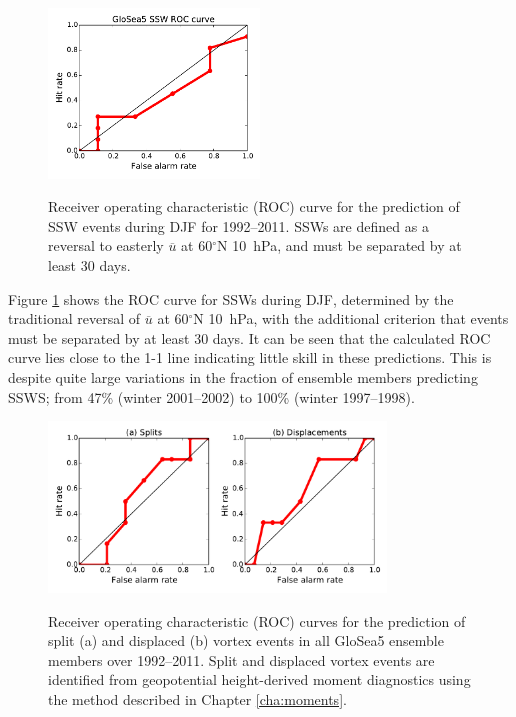 \begin{figure}[t] \centering
  \noindent\includegraphics[width=0.5\textwidth,angle=0]{figures/chapter-seasonal/SSW_ROC.pdf}\\
  \caption[ROC curve for the prediction of SSWs.]{Receiver operating
    characteristic (ROC) curve for the prediction of SSW events during DJF for
    1992--2011. SSWs are defined as a reversal to easterly $\overline{u}$ at
    60$^{\circ}$N 10~hPa, and must be separated by at least 30
    days.}\label{fig:ssw_roc}
\end{figure}

Figure \ref{fig:ssw_roc} shows the ROC curve for SSWs during DJF, determined by
the traditional reversal of $\overline{u}$ at 60$^\circ$N 10~hPa, with the
additional criterion that events must be separated by at least 30 days. It can
be seen that the calculated ROC curve lies close to the 1-1 line indicating
little skill in these predictions. This is despite quite large variations in the
fraction of ensemble members predicting SSWS; from 47\% (winter 2001--2002) to
100\% (winter 1997--1998).

\begin{figure}[t] \centering
  \noindent\includegraphics[width=0.8\textwidth,angle=0]{figures/chapter-seasonal/glosea_split_displ_ROC_any.pdf}\\
  \caption[ROC curves for the prediction of split and displaced vortex
  events.]{Receiver operating characteristic (ROC) curves for the prediction of
    split (a) and displaced (b) vortex events in all GloSea5 ensemble members
    over 1992--2011. Split and displaced vortex events are identified from
    geopotential height-derived moment diagnostics using the method described in
    Chapter \ref{cha:moments}.}\label{fig:split_displ_roc}
\end{figure}

